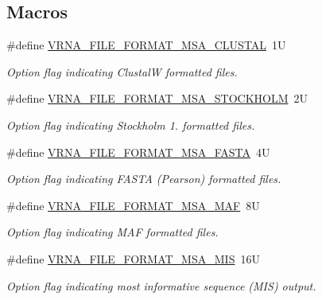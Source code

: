 \subsection*{Macros}
\begin{DoxyCompactItemize}
\item 
\#define \mbox{\hyperlink{group__file__formats__msa_ga79a23de2c7249f2cccd762e475c81859}{V\+R\+N\+A\+\_\+\+F\+I\+L\+E\+\_\+\+F\+O\+R\+M\+A\+T\+\_\+\+M\+S\+A\+\_\+\+C\+L\+U\+S\+T\+AL}}~1U
\begin{DoxyCompactList}\small\item\em Option flag indicating ClustalW formatted files. \end{DoxyCompactList}\item 
\#define \mbox{\hyperlink{group__file__formats__msa_ga62be992445cd8ab2ad7a8fded944338b}{V\+R\+N\+A\+\_\+\+F\+I\+L\+E\+\_\+\+F\+O\+R\+M\+A\+T\+\_\+\+M\+S\+A\+\_\+\+S\+T\+O\+C\+K\+H\+O\+LM}}~2U
\begin{DoxyCompactList}\small\item\em Option flag indicating Stockholm 1. formatted files. \end{DoxyCompactList}\item 
\#define \mbox{\hyperlink{group__file__formats__msa_gacf6274a2c825f34e4131404665b00604}{V\+R\+N\+A\+\_\+\+F\+I\+L\+E\+\_\+\+F\+O\+R\+M\+A\+T\+\_\+\+M\+S\+A\+\_\+\+F\+A\+S\+TA}}~4U
\begin{DoxyCompactList}\small\item\em Option flag indicating F\+A\+S\+TA (Pearson) formatted files. \end{DoxyCompactList}\item 
\#define \mbox{\hyperlink{group__file__formats__msa_gab3186d774c01570d2a47d0308eec4927}{V\+R\+N\+A\+\_\+\+F\+I\+L\+E\+\_\+\+F\+O\+R\+M\+A\+T\+\_\+\+M\+S\+A\+\_\+\+M\+AF}}~8U
\begin{DoxyCompactList}\small\item\em Option flag indicating M\+AF formatted files. \end{DoxyCompactList}\item 
\#define \mbox{\hyperlink{group__file__formats__msa_ga494488a771aa0c602fb4cf445be34d47}{V\+R\+N\+A\+\_\+\+F\+I\+L\+E\+\_\+\+F\+O\+R\+M\+A\+T\+\_\+\+M\+S\+A\+\_\+\+M\+IS}}~16U
\begin{DoxyCompactList}\small\item\em Option flag indicating most informative sequence (M\+IS) output. \end{DoxyCompactList}\item 

\end{DoxyCompactItemize}
